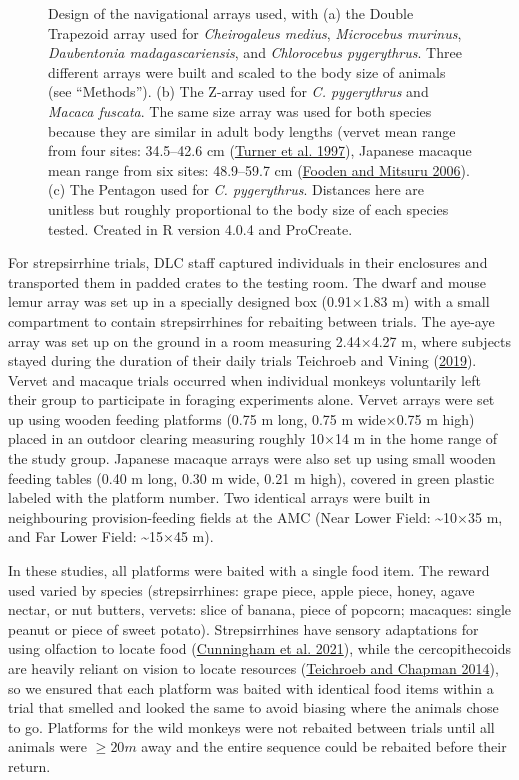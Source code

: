 \documentclass[twoside,12pt,final]{ucthesis-CA2012}
\begin{document}
\begin{ucmainmatter}
\begin{figure}[htbp]
\centering
\setlength{\fboxsep}{0pt}
\setlength{\fboxrule}{1pt}
\caption[Design of the navigational arrays used]{ Design of the navigational arrays used, with (a) the Double Trapezoid array used for \emph{Cheirogaleus medius}, \emph{Microcebus murinus}, \emph{Daubentonia madagascariensis}, and \emph{Chlorocebus pygerythrus}. Three different arrays were built and scaled to the body size of animals (see ``Methods''). (b) The Z-array used for \emph{C. pygerythrus} and \emph{Macaca fuscata}. The same size array was used for both species because they are similar in adult body lengths (vervet mean range from four sites: 34.5--42.6 cm (\protect\hyperlink{ref-turner1997}{Turner et al. 1997}), Japanese macaque mean range from six sites: 48.9--59.7 cm (\protect\hyperlink{ref-fooden2006}{Fooden and Mitsuru 2006}). (c) The Pentagon used for \emph{C. pygerythrus}. Distances here are unitless but roughly proportional to the body size of each species tested. Created in R version 4.0.4 and ProCreate.
\label{fig1_arrays}}
\end{figure}
For strepsirrhine trials, DLC staff captured individuals in their enclosures and transported them in padded crates to the testing room. The dwarf and mouse lemur array was set up in a specially designed box (0.91×1.83 m) with a small compartment to contain strepsirrhines for rebaiting between trials. The aye-aye array was set up on the ground in a room measuring 2.44×4.27 m, where subjects stayed during the duration of their daily trials Teichroeb and Vining (\protect\hyperlink{ref-teichroeb2019a}{2019}). Vervet and macaque trials occurred when individual monkeys voluntarily left their group to participate in foraging experiments alone. Vervet arrays were set up using wooden feeding platforms (0.75 m long, 0.75 m wide×0.75 m high) placed in an outdoor clearing measuring roughly 10×14 m in the home range of the study group. Japanese macaque arrays were also set up using small wooden feeding tables (0.40 m long, 0.30 m wide, 0.21 m high), covered in green plastic labeled with the platform number. Two identical arrays were built in neighbouring provision-feeding fields at the AMC (Near Lower Field: \textasciitilde10×35 m, and Far Lower Field: \textasciitilde15×45 m).

In these studies, all platforms were baited with a single food item. The reward used varied by species (strepsirrhines: grape piece, apple piece, honey, agave nectar, or nut butters, vervets: slice of banana, piece of popcorn; macaques: single peanut or piece of sweet potato). Strepsirrhines have sensory adaptations for using olfaction to locate food (\protect\hyperlink{ref-cunningham2021}{Cunningham et al. 2021}), while the cercopithecoids are heavily reliant on vision to locate resources (\protect\hyperlink{ref-teichroeb2014}{Teichroeb and Chapman 2014}), so we ensured that each platform was baited with identical food items within a trial that smelled and looked the same to avoid biasing where the animals chose to go. Platforms for the wild monkeys were not rebaited between trials until all animals were \(\ge20m\) away and the entire sequence could be rebaited before their return.


\end{ucmainmatter}
\end{document}
